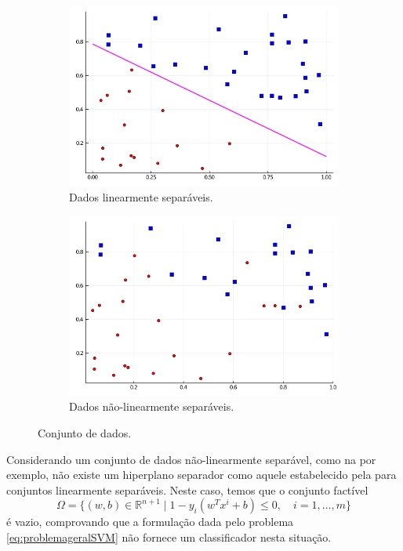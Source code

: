 \documentclass[12pt,a4paper]{scrartcl}
\def\RR{\mathds{R}}
\theoremstyle{definition}%
\begin{document}
\begin{figure}[!ht] 
	\centering
	\begin{subfigure}[h]{0.45\textwidth}
		\centering
		\includegraphics[width=\textwidth]{dados_separaveis_SVMflexivel.png}
		\caption{Dados linearmente separáveis. \label{fig:dados_linearmente_separaveis_e_nao_separaveis:a}}
	\end{subfigure}
	\begin{subfigure}[h]{0.45\textwidth}
		\centering
		\includegraphics[width=\textwidth]{dados_naoseparaveis_SVMflexivel.png}
		\caption{Dados não-linearmente separáveis. \label{fig:dados_linearmente_separaveis_e_nao_separaveis:b}}
	\end{subfigure}
\caption{Conjunto de dados. \label{fig:dados_linearmente_separaveis_e_nao_separaveis} }
\end{figure}

Considerando um conjunto de dados não-linearmente separável, como na  por exemplo, não existe um hiperplano separador como aquele estabelecido pela  para conjuntos linearmente separáveis. Neste caso, temos que o conjunto factível
\[
\Omega = \{ (w,b) \in \RR^{n+1} \mid 1-y_{i}(w^{T}x^{i} + b) \leq 0 , \quad i=1, \ldots , m \}
\]
é vazio, comprovando que a formulação dada pelo problema \eqref{eq:problemageralSVM} não fornece um classificador nesta situação.
\end{document}
